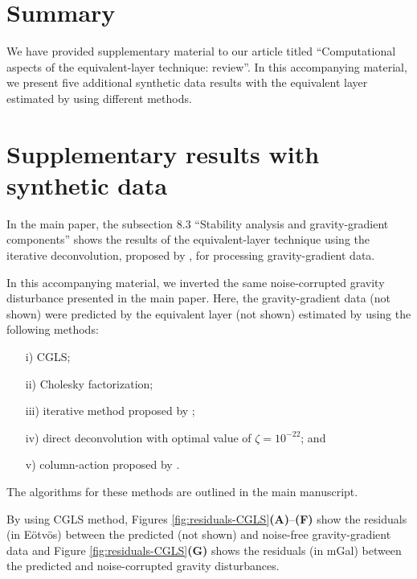 \documentclass[utf8]{frontiers_suppmat} %
\begin{document}
\onecolumn
{}

\title {{}}


\maketitle


\section{Summary}

We have provided supplementary material to our article titled ``Computational aspects of the equivalent-layer technique: review''.
In this accompanying material, we present five additional synthetic data results with the equivalent layer estimated by using different 
methods.

\section{Supplementary results with synthetic data}


In the main paper, the subsection 8.3 ``Stability analysis and gravity-gradient components''
shows the results of the equivalent-layer technique using the iterative deconvolution, 
proposed by \cite{takahashi-etal2020}, for processing gravity-gradient data.

In this accompanying material, we inverted the same noise-corrupted gravity disturbance presented in the main paper.
Here, the gravity-gradient data (not shown) were predicted by the equivalent layer (not shown) estimated by using the following methods:
\begin{itemize}
	\item[i)] CGLS;
	\item[ii)] Cholesky factorization;
	\item[iii)] iterative method proposed by \citet{siqueira-etal2017};
	\item[iv)] direct deconvolution with optimal value of $\zeta = 10^{-22}$; and
	\item[v)] column-action proposed by \cite{cordell1992}.
\end{itemize}
The algorithms for these methods are outlined in the main manuscript.

By using CGLS method, Figures \ref{fig:residuals-CGLS}\textbf{(A)}--\textbf{(F)} show the residuals (in Eötvös) 
between the predicted (not shown) and noise-free gravity-gradient data 
and Figure \ref{fig:residuals-CGLS}\textbf{(G)} shows the residuals (in mGal) between the predicted and noise-corrupted gravity disturbances.
\end{document}
